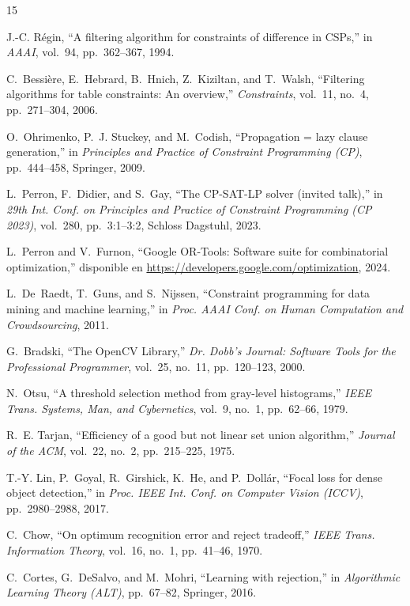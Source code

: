 \documentclass[conference]{IEEEtran}
\begin{document}
\begin{thebibliography}{15}

J.-C. R{\'e}gin, ``A filtering algorithm for constraints of difference in CSPs,'' in \emph{AAAI}, vol.~94, pp.~362--367, 1994.

C.~Bessi{\`e}re, E.~Hebrard, B.~Hnich, Z.~Kiziltan, and T.~Walsh, ``Filtering algorithms for table constraints: An overview,'' \emph{Constraints}, vol.~11, no.~4, pp.~271--304, 2006.

O.~Ohrimenko, P.~J. Stuckey, and M.~Codish, ``Propagation = lazy clause generation,'' in \emph{Principles and Practice of Constraint Programming (CP)}, pp.~444--458, Springer, 2009.

L.~Perron, F.~Didier, and S.~Gay, ``The {CP-SAT-LP} solver (invited talk),'' in \emph{29th Int. Conf. on Principles and Practice of Constraint Programming (CP 2023)}, vol.~280, pp.~3:1--3:2, Schloss Dagstuhl, 2023.

L.~Perron and V.~Furnon, ``Google {OR-Tools}: Software suite for combinatorial optimization,'' disponible en \url{https://developers.google.com/optimization}, 2024.

L.~De~Raedt, T.~Guns, and S.~Nijssen, ``Constraint programming for data mining and machine learning,'' in \emph{Proc. AAAI Conf. on Human Computation and Crowdsourcing}, 2011.

G.~Bradski, ``The {OpenCV} Library,'' \emph{Dr. Dobb's Journal: Software Tools for the Professional Programmer}, vol.~25, no.~11, pp.~120--123, 2000.

N.~Otsu, ``A threshold selection method from gray-level histograms,'' \emph{IEEE Trans. Systems, Man, and Cybernetics}, vol.~9, no.~1, pp.~62--66, 1979.

R.~E. Tarjan, ``Efficiency of a good but not linear set union algorithm,'' \emph{Journal of the ACM}, vol.~22, no.~2, pp.~215--225, 1975.

T.-Y. Lin, P.~Goyal, R.~Girshick, K.~He, and P.~Doll{\'a}r, ``Focal loss for dense object detection,'' in \emph{Proc. IEEE Int. Conf. on Computer Vision (ICCV)}, pp.~2980--2988, 2017.

C.~Chow, ``On optimum recognition error and reject tradeoff,'' \emph{IEEE Trans. Information Theory}, vol.~16, no.~1, pp.~41--46, 1970.

C.~Cortes, G.~DeSalvo, and M.~Mohri, ``Learning with rejection,'' in \emph{Algorithmic Learning Theory (ALT)}, pp.~67--82, Springer, 2016.

\end{thebibliography}
\end{document}
